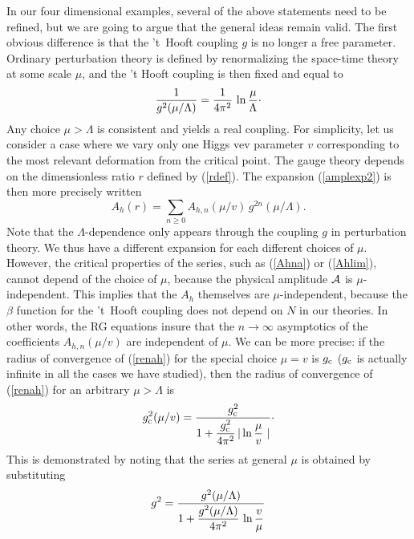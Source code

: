 \documentclass[a4paper,12pt]{article}
\begin{document}
{In our four dimensional examples, several of 
the above statements need to be refined, but we are going to argue that 
the general ideas remain valid. The first obvious difference is that the 
't~Hooft coupling $g$ is no longer a free parameter. 
Ordinary perturbation theory is defined by renormalizing the space-time
theory at some scale $\mu$, and the 't Hooft coupling 
is then fixed and equal to
%
\begin{equation}
\label{RG}
{1\over g^{2}(\mu/\Lambda)} = 
{1\over 4\pi^{2}}\, \ln {\mu\over\Lambda}\cdotp
\end{equation}
%
Any choice $\mu>\Lambda$ is consistent and yields a real coupling.
For simplicity, let us consider
a case where we vary only one Higgs vev parameter $v$ corresponding to the
most relevant deformation from the critical point. The gauge theory
depends on the dimensionless ratio $r$ defined by (\ref{rdef}).
The expansion (\ref{amplexp2}) is then more precisely written
%
\begin{equation}
\label{renah}
A_h(r) = \sum_{n\geq 0} A_{h,n}(\mu /v)\, g^{2n}(\mu /\Lambda).
\end{equation}
%
Note that the $\Lambda$-dependence only appears through the coupling $g$ 
in perturbation theory.
We thus have a different expansion for each different choices of $\mu$. 
However, the critical properties of the series, such as (\ref{Ahna}) or 
(\ref{Ahlim}), cannot depend of the choice of $\mu$, because the physical 
amplitude $\cal A$ is $\mu$-independent. This implies that the 
$A_h$ themselves are $\mu$-independent, because the $\beta$ function 
for the 't~Hooft coupling does not depend on $N$ in our theories. In other 
words, the RG equations insure that the $n\rightarrow\infty$ asymptotics 
of the coefficients $A_{h,n}(\mu /v)$ are independent of $\mu$. We can be 
more precise: if the radius of convergence of (\ref{renah}) for the 
special choice $\mu =v$ 
is $g_{\rm c}$ ($g_{\rm c}$ is actually infinite in all the cases we have studied),
then the radius of convergence of (\ref{renah}) for an 
arbitrary $\mu>\Lambda$ is
%
\begin{equation}
\label{gcform}
g_{\rm c}^2 (\mu /v) = {g_{\rm c}^2\over \displaystyle 1+ {g_{\rm c}^2\over 4\pi^2}\,
|\ln {\mu\over v}\,\,|}\cdotp
\end{equation}
%
This is demonstrated by noting that the series at general $\mu$ is obtained 
by substituting
%
\begin{equation}
\label{newrensc}
g^2 = {g^2(\mu /\Lambda)\over 1+ \displaystyle
{g^2(\mu /\Lambda)\over 4\pi^2}\, \ln {v\over\mu}}
\end{equation}
}
\end{document}

